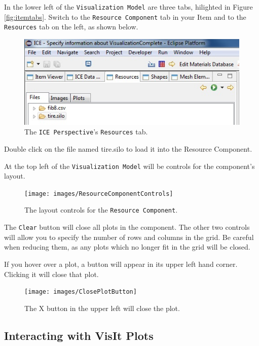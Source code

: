 In the lower left of the \texttt{Visualization Model} are three tabs, hilighted
in Figure \ref{fig:itemtabs}.
Switch to the \texttt{Resource Component} tab in your Item and to the
\texttt{Resources} tab on the left, as shown below.

\begin{figure}[!h]
\includegraphics[width=12cm]{images/ResourcesTab}
\centering
\caption{The \texttt{ICE Perspective}'s \texttt{Resources} tab.}
\label{fig:resourcestab}
\end{figure}

Double click on the file named tire.silo to load it into the Resource
Component.

At the top left of the \texttt{Visualization Model} will be controls for the
component's layout.

\begin{figure}[!h]
\texttt{[image: images/ResourceComponentControls]}
\centering
\caption{The layout controls for the \texttt{Resource Component}.}
\label{fig:resourcecomponentcontrols}
\end{figure}

The \texttt{Clear} button will close all plots in the component. The other two
controls will allow you to specify the number of rows and columns in the grid.
Be careful when reducing them, as any plots which no longer fit in the grid will
be closed.

If you hover over a plot, a button will appear in its upper left hand corner.
Clicking it will close that plot. 

\begin{figure}[!h]
\texttt{[image: images/ClosePlotButton]}
\centering
\caption{The X button in the upper left will close the plot.}
\label{fig:closeplotbutton}
\end{figure}

\subsection{Interacting with VisIt Plots}

